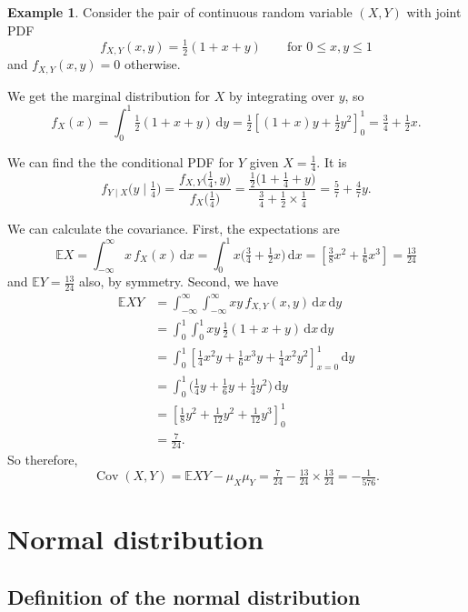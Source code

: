 \documentclass[
  a4paper,
]{book}
\theoremstyle{definition}
\theoremstyle{definition}
\newtheorem{example}{Example}[chapter]
\theoremstyle{definition}
\theoremstyle{definition}
\theoremstyle{remark}
\begin{document}
\begin{example}
Consider the pair of continuous random variable \((X,Y)\) with joint PDF
\[ f_{X,Y}(x,y) = \tfrac12(1 + x + y) \qquad \text{for $0 \leq x,y\leq 1$} \]
and \(f_{X,Y}(x,y) = 0\) otherwise.

We get the marginal distribution for \(X\) by integrating over \(y\), so
\[ f_X(x) = \int_0^1 \tfrac12(1 + x + y) \, \mathrm dy = \tfrac12 \left[(1 + x)y + \tfrac12y^2\right]_0^1 = \tfrac34 + \tfrac12x . \]

We can find the the conditional PDF for \(Y\) given \(X = \tfrac14\). It is
\[ f_{Y\mid X}\big(y \mid \tfrac14\big) = \frac{f_{X,Y}\big(\tfrac14,y\big)}{f_X\big(\tfrac14\big)}
    = \frac{\tfrac12\big(1 + \tfrac14 + y\big)}{\tfrac34 + \tfrac12\times\tfrac14 } = \tfrac{5}{7} + \tfrac47 y . \]

We can calculate the covariance. First, the expectations are
\[ \mathbb EX = \int_{-\infty}^\infty x\, f_X(x) \,\mathrm dx = \int_0^1 x\big(\tfrac34 + \tfrac12x\big)\, \mathrm dx = \left[\tfrac38 x^2 + \tfrac16 x^3 \right] = \tfrac{13}{24} \]
and \(\mathbb EY = \frac{13}{24}\) also, by symmetry. Second, we have
\begin{align*}
\mathbb EXY
&= \int_{-\infty}^\infty \int_{-\infty}^\infty xy\, f_{X,Y}(x,y) \, \mathrm dx\, \mathrm dy \\
&= \int_0^1 \int_0^1 xy \, \tfrac12(1 + x + y)\, \mathrm dx\, \mathrm dy \\
&= \int_0^1 \left[ \tfrac14 x^2y + \tfrac16 x^3y + \tfrac14 x^2y^2  \right]_{x=0}^1 \, \mathrm dy\\
&= \int_0^1 \big( \tfrac14 y + \tfrac16 y + \tfrac14 y^2 \big) \, \mathrm dy\\
&= \left[ \tfrac18 y^2 + \tfrac{1}{12}y^2 + \tfrac{1}{12}y^3  \right]_0^1 \\
&= \tfrac{7}{24} .
\end{align*}
So therefore,
\[ \operatorname{Cov}(X,Y) = \mathbb EXY - \mu_X \mu_Y = \tfrac{7}{24} - \tfrac{13}{24} \times \tfrac{13}{24} = -\tfrac{1}{576} . \]
\end{example}

\hypertarget{S09-normal}{%
\chapter{Normal distribution}\label{S09-normal}}

\hypertarget{normal-definition}{%
\section{Definition of the normal distribution}\label{normal-definition}}
\end{document}
